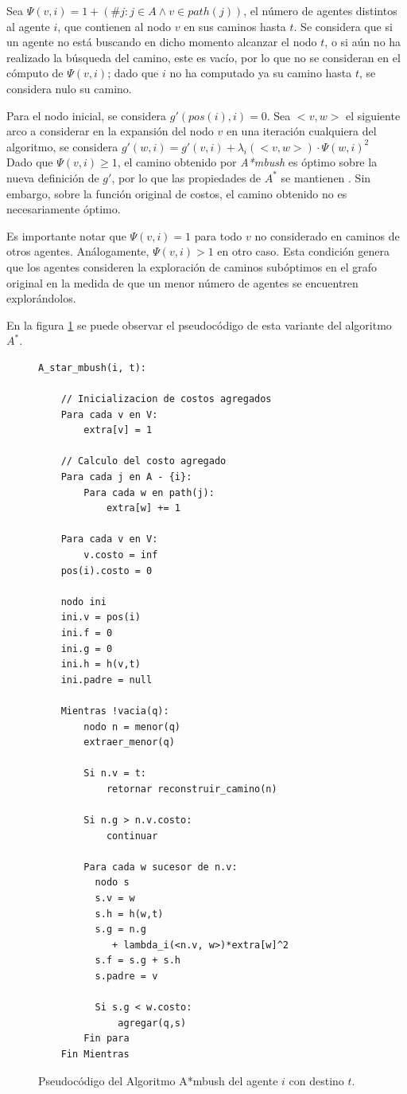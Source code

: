 \documentclass{egpubl}
\begin{document}
Sea $\Psi(v,i) = 1+(\# j : j \in A \wedge v \in path(j))$,
el número de agentes distintos al agente $i$, que contienen al
nodo $v$ en sus caminos hasta $t$. Se considera que si un agente
no está buscando en dicho momento alcanzar el nodo $t$, o si
aún no ha realizado la búsqueda del camino, este es vacío, por
lo que no se consideran en el cómputo de $\Psi(v,i)$; dado
que $i$ no ha computado ya su camino hasta $t$, se considera
nulo su camino.

Para el nodo inicial, se considera $g'(pos(i),i) = 0$.
Sea $<v,w>$ el siguiente arco a considerar en la expansión del
nodo $v$ en una iteración cualquiera del algoritmo, se considera
$g'(w, i) = g'(v,i) + \lambda_i(<v,w>) \cdot \Psi(w,i)^2$\\

Dado que $\Psi(v,i) \geq 1$, el camino obtenido por \textit{A*mbush}
es óptimo sobre la nueva definición de $g'$, por lo que las
propiedades de $A^*$ se mantienen \cite{HNR72}. Sin embargo, sobre
la función original de costos, el camino obtenido no es necesariamente
óptimo.

Es importante notar que $\Psi(v,i) = 1$ para todo $v$ no
considerado en caminos de otros agentes. Análogamente,
$\Psi(v,i) > 1$ en otro caso. Esta condición genera que
los agentes consideren la exploración de caminos subóptimos
en el grafo original en la medida de que un menor número
de agentes se encuentren explorándolos.

En la figura \ref{fig:ambush} se puede observar el pseudocódigo
de esta variante del algoritmo $A^*$.

\begin{figure}[htb]
\begin{verbatim}
A_star_mbush(i, t):
    
    // Inicializacion de costos agregados
    Para cada v en V:
        extra[v] = 1
    
    // Calculo del costo agregado
    Para cada j en A - {i}:
        Para cada w en path(j):
            extra[w] += 1

    Para cada v en V:
        v.costo = inf
    pos(i).costo = 0

    nodo ini
    ini.v = pos(i)
    ini.f = 0
    ini.g = 0
    ini.h = h(v,t)
    ini.padre = null
    
    Mientras !vacia(q):
        nodo n = menor(q)
        extraer_menor(q)
        
        Si n.v = t:
            retornar reconstruir_camino(n)
        
        Si n.g > n.v.costo:
            continuar
        
        Para cada w sucesor de n.v:
          nodo s
          s.v = w
          s.h = h(w,t)
          s.g = n.g 
             + lambda_i(<n.v, w>)*extra[w]^2
          s.f = s.g + s.h
          s.padre = v
            
          Si s.g < w.costo:
              agregar(q,s)
        Fin para
    Fin Mientras
\end{verbatim}

\caption{\label{fig:ambush}
     Pseudocódigo del Algoritmo A*mbush del agente $i$ con destino $t$.}
\end{figure}
\end{document}
